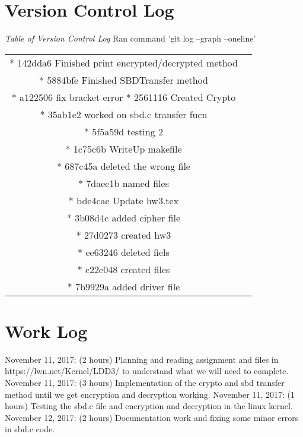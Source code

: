 \documentclass{article}
\begin{document}
\section*{Version Control Log}
\textit{Table of Version Control Log} Ran command 'git log --graph --oneline'
\newline
\begin{center}
\begin{tabular}{ c c }
* 142dda6 Finished print encrypted/decrypted method \\
* 5884bfe Finished SBDTransfer method \\
* a122506 fix bracket error
* 2561116 Created Crypto \\
* 35ab1e2 worked on sbd.c transfer fucn \\
* 5f5a59d testing 2 \\
* 1c75c6b WriteUp makefile \\
* 687c45a deleted the wrong file \\
* 7daee1b named files \\
* bde4cae Update hw3.tex \\
* 3b08d4c added cipher file  \\
* 27d0273 created hw3 \\
* ee63246 deleted fiels \\
* c22e048 created files \\
* 7b9929a added driver file
\end{tabular}
\end{center}

\section*{Work Log}
November 11, 2017: (2 hours) Planning and reading assignment and files in https://lwn.net/Kernel/LDD3/
to understand what we will need to complete.
November 11, 2017: (3 hours) Implementation of the crypto and sbd transfer method
until we get encryption and decryption working.
November 11, 2017: (1 hours) Testing the sbd.c file and encryption and decryption in
the linux kernel.
November 12, 2017: (2 hours) Documentation work and fixing some minor errors in
sbd.c code.
\end{document}

